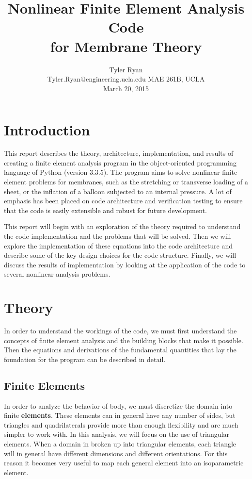 \documentclass[]{spie}  %
\title{Nonlinear Finite Element Analysis Code\\ for Membrane Theory}
\author{Tyler Ryan \\
	Tyler.Ryan@engineering.ucla.edu
\skiplinehalf
MAE 261B, UCLA \\
March 20, 2015
}
\begin{document}
 
\maketitle 

\tableofcontents
\pagebreak

\section{Introduction}
\label{section: introduction}
This report describes the theory, architecture, implementation, and results of creating a finite element analysis program in the object-oriented programming language of Python (version 3.3.5). The program aims to solve nonlinear finite element problems for membranes, such as the stretching or transverse loading of a sheet, or the inflation of a balloon subjected to an internal pressure. A lot of emphasis has been placed on code architecture and verification testing to ensure that the code is easily extensible and robust for future development.

This report will begin with an exploration of the theory required to understand the code implementation and the problems that will be solved. Then we will explore the implementation of these equations into the code architecture and describe some of the key design choices for the code structure. Finally, we will discuss the results of implementation by looking at the application of the code to several  nonlinear analysis problems. 

\section{Theory}
In order to understand the workings of the code, we must first understand the concepts of finite element analysis and the building blocks that make it possible. Then the equations and derivations of the fundamental quantities that lay the foundation for the program can be described in detail. 

\subsection{Finite Elements}
\label{sec: finite elements}
In order to analyze the behavior of body, we must discretize the domain into finite \textbf{elements}. These elements can in general have any number of sides, but triangles and quadrilaterals provide more than enough flexibility and are much simpler to work with. In this analysis, we will focus on the use of triangular elements. When a domain in broken up into triangular elements, each triangle will in general have different dimensions and different orientations. For this reason it becomes very useful to map each general element into an isoparametric element.
\end{document}
